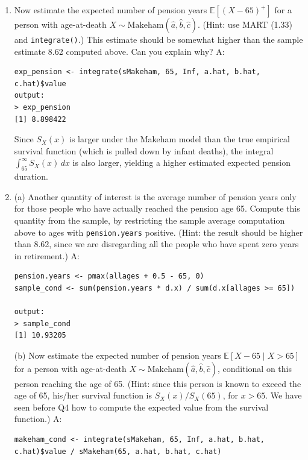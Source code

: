\documentclass{article}
\begin{document}
\begin{enumerate}
So the people in our sample have spent an average of 8.62 years in retirement.

\item[$\boldsymbol{Q_5}$] Now estimate the expected number of pension years $\mathbb{E}[(X - 65)^+]$ for a person with age-at-death $X \sim \text{Makeham}(\hat{a}, \hat{b}, \hat{c})$. (Hint: use MART (1.33) and \texttt{integrate()}.) This estimate should be somewhat higher than the sample estimate 8.62 computed above. Can you explain why?
\newline \newline A:
\begin{verbatim}
exp_pension <- integrate(sMakeham, 65, Inf, a.hat, b.hat, c.hat)$value
output:
> exp_pension
[1] 8.898422
\end{verbatim}
Since $S_X(x)$ is larger under the Makeham model than the true empirical survival function (which is pulled down by infant deaths), the integral $\int_{65}^\infty S_X(x)\,dx$ is also larger, yielding a higher estimated expected pension duration.



\newpage
\item[$\boldsymbol{Q_6}$] (a) Another quantity of interest is the average number of pension years only for those people who have actually reached the pension age 65. Compute this quantity from the sample, by restricting the sample average computation above to ages with \texttt{pension.years} positive. (Hint: the result should be higher than 8.62, since we are disregarding all the people who have spent zero years in retirement.)
\newline \newline A:
\begin{verbatim}
pension.years <- pmax(allages + 0.5 - 65, 0)
sample_cond <- sum(pension.years * d.x) / sum(d.x[allages >= 65])

output:
> sample_cond
[1] 10.93205
\end{verbatim}

(b) Now estimate the expected number of pension years $\mathbb{E}[X - 65 \mid X > 65]$ for a person with age-at-death $X \sim \text{Makeham}(\hat{a}, \hat{b}, \hat{c})$, conditional on this person reaching the age of 65. (Hint: since this person is known to exceed the age of 65, his/her survival function is $S_X(x)/S_X(65)$, for $x > 65$. We have seen before Q4 how to compute the expected value from the survival function.)
\newline \newline A:
\begin{verbatim}
makeham_cond <- integrate(sMakeham, 65, Inf, a.hat, b.hat, c.hat)$value / sMakeham(65, a.hat, b.hat, c.hat)


\end{verbatim}
\end{enumerate}
\end{document}
